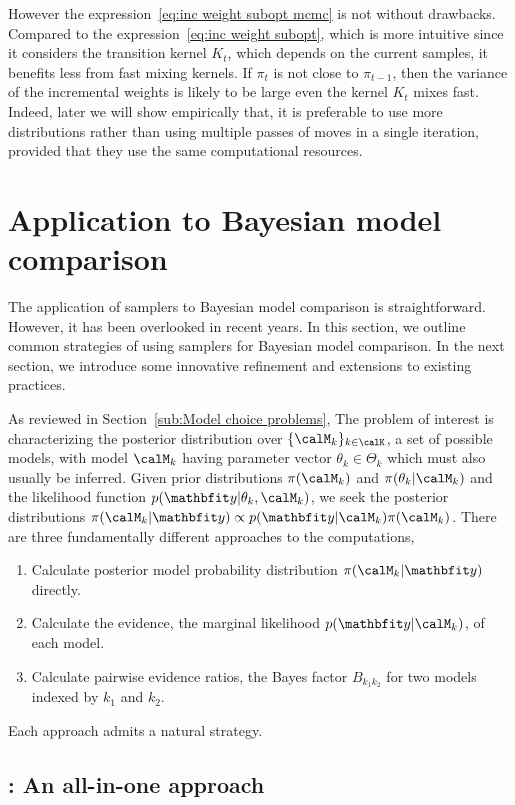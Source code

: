 However the expression~\eqref{eq:inc weight subopt mcmc} is not without
drawbacks. Compared to the expression~\eqref{eq:inc weight subopt}, which is
more intuitive since it considers the transition kernel $K_t$, which depends
on the current samples, it benefits less from fast mixing kernels. If $\pi_t$
is not close to $\pi_{t-1}$, then the variance of the incremental weights is
likely to be large even the kernel $K_t$ mixes fast. Indeed, later we will
show empirically that, it is preferable to use more distributions rather than
using multiple passes of \mcmc moves in a single iteration, provided that they
use the same computational resources.

\section{Application to Bayesian model comparison}
\label{sec:Application to Bayesian model comparison}

The application of \smc samplers to Bayesian model comparison is
straightforward. However, it has been overlooked in recent years. In this
section, we outline common strategies of using \smc samplers for Bayesian
model comparison. In the next section, we introduce some innovative refinement
and extensions to existing practices.

As reviewed in Section~\ref{sub:Model choice problems}, The problem of
interest is characterizing the posterior distribution over
$\{\calM_k\}_{k\in\calK}$, a set of possible models, with model $\calM_k$
having parameter vector $\theta_k\in\Theta_k$ which must also usually be
inferred. Given prior distributions $\pi(\calM_k)$ and $\pi(\theta_k|\calM_k)$
and the likelihood function $p(\data|\theta_k,\calM_k)$, we seek the posterior
distributions $\pi(\calM_k|\data)\propto p(\data|\calM_k)\pi(\calM_k)$. There
are three fundamentally different approaches to the computations,
\begin{enumerate}
  \item Calculate posterior model probability distribution
    $\pi(\calM_k|\data)$ directly.
  \item Calculate the evidence, the marginal likelihood $p(\data|\calM_k)$, of
    each model.
  \item Calculate pairwise evidence ratios, the Bayes factor $B_{k_1k_2}$ for
    two models indexed by $k_1$ and $k_2$.
\end{enumerate}
Each approach admits a natural \smc strategy.

\subsection[SMC1: An all-in-on approach]{\smc[1]: An all-in-one approach}
\label{sub:smc1: An all-in-one approach}

